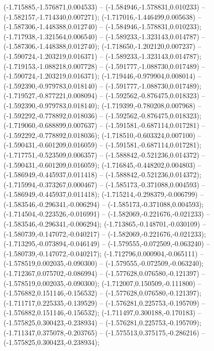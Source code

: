  (-1.715885,-1.576871,0.004533) -- (-1.584946,-1.578831,0.010233) -- (-1.582157,-1.714340,0.007271);
 (-1.717016,-1.446499,0.005638) -- (-1.587306,-1.448388,0.012740) -- (-1.584946,-1.578831,0.010233);
 (-1.717938,-1.321564,0.006540) -- (-1.589233,-1.323143,0.014787) -- (-1.587306,-1.448388,0.012740);
 (-1.718650,-1.202120,0.007237) -- (-1.590724,-1.203219,0.016371) -- (-1.589233,-1.323143,0.014787);
 (-1.719153,-1.088218,0.007728) -- (-1.591777,-1.088730,0.017489) -- (-1.590724,-1.203219,0.016371);
 (-1.719446,-0.979904,0.008014) -- (-1.592390,-0.979783,0.018140) -- (-1.591777,-1.088730,0.017489);
 (-1.719527,-0.877221,0.008094) -- (-1.592562,-0.876475,0.018323) -- (-1.592390,-0.979783,0.018140);
 (-1.719399,-0.780208,0.007968) -- (-1.592292,-0.778892,0.018036) -- (-1.592562,-0.876475,0.018323);
 (-1.719060,-0.688899,0.007637) -- (-1.591581,-0.687114,0.017281) -- (-1.592292,-0.778892,0.018036);
 (-1.718510,-0.603324,0.007100) -- (-1.590431,-0.601209,0.016059) -- (-1.591581,-0.687114,0.017281);
 (-1.717751,-0.523509,0.006357) -- (-1.588842,-0.521236,0.014372) -- (-1.590431,-0.601209,0.016059);
 (-1.716845,-0.448202,0.004803) -- (-1.586949,-0.445937,0.011418) -- (-1.588842,-0.521236,0.014372);
 (-1.715994,-0.373267,0.000467) -- (-1.585173,-0.371088,0.004593) -- (-1.586949,-0.445937,0.011418);
 (-1.715214,-0.298379,-0.006799) -- (-1.583546,-0.296341,-0.006294) -- (-1.585173,-0.371088,0.004593);
 (-1.714504,-0.223526,-0.016991) -- (-1.582069,-0.221676,-0.021233) -- (-1.583546,-0.296341,-0.006294);
 (-1.713865,-0.148701,-0.030109) -- (-1.580739,-0.147072,-0.040217) -- (-1.582069,-0.221676,-0.021233);
 (-1.713295,-0.073894,-0.046149) -- (-1.579555,-0.072509,-0.063240) -- (-1.580739,-0.147072,-0.040217);
 (-1.712796,0.000904,-0.065111) -- (-1.578519,0.002035,-0.090300) -- (-1.579555,-0.072509,-0.063240);
 (-1.712367,0.075702,-0.086994) -- (-1.577628,0.076580,-0.121397) -- (-1.578519,0.002035,-0.090300);
 (-1.712007,0.150509,-0.111800) -- (-1.576882,0.151146,-0.156532) -- (-1.577628,0.076580,-0.121397);
 (-1.711717,0.225335,-0.139529) -- (-1.576281,0.225753,-0.195709) -- (-1.576882,0.151146,-0.156532);
 (-1.711497,0.300188,-0.170183) -- (-1.575825,0.300423,-0.238934) -- (-1.576281,0.225753,-0.195709);
 (-1.711347,0.375078,-0.203765) -- (-1.575513,0.375175,-0.286216) -- (-1.575825,0.300423,-0.238934);
